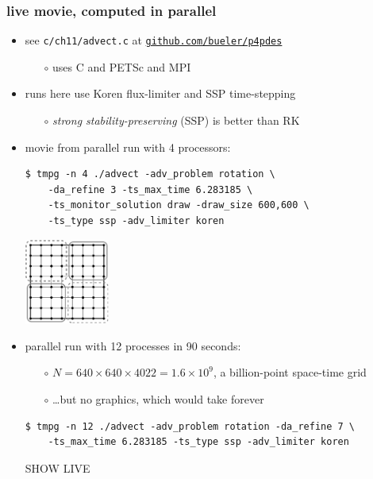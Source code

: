 \documentclass[10pt,dvipsnames,usepdftitle=false,
hyperref={pdftitle = {Finite volume methods},
    pdfauthor = {Ed Bueler}}]{beamer}
\begin{document}
\begin{frame}[fragile]
\frametitle{live movie, computed in parallel}

\begin{itemize}
\item see \texttt{c/ch11/advect.c} at \href{https://github.com/bueler/p4pdes}{\texttt{github.com/bueler/p4pdes}}
    \begin{itemize}
    \item[$\circ$] uses C and PETSc and MPI
    \end{itemize}
\item runs here use Koren flux-limiter and SSP time-stepping
    \begin{itemize}
    \item[$\circ$] \emph{strong stability-preserving} (SSP) is better than RK
    \end{itemize}
\item movie from parallel run with 4 processors:
\begin{Verbatim}[fontsize=\footnotesize]
$ tmpg -n 4 ./advect -adv_problem rotation \
    -da_refine 3 -ts_max_time 6.283185 \
    -ts_monitor_solution draw -draw_size 600,600 \
    -ts_type ssp -adv_limiter koren
\end{Verbatim}

\vspace{-20mm}
\hfill \includegraphics[width=0.22\textwidth]{figs/buelerfourproc}

\vspace{-1mm}
\item parallel run with 12 processes in 90 seconds:
    \begin{itemize}
    \item[$\circ$] $N=640\times 640 \times 4022 = 1.6 \times 10^9$, a billion-point space-time grid
    \item[$\circ$] \dots but no graphics, which would take forever
    \end{itemize}
\begin{Verbatim}[fontsize=\footnotesize]
$ tmpg -n 12 ./advect -adv_problem rotation -da_refine 7 \
    -ts_max_time 6.283185 -ts_type ssp -adv_limiter koren
\end{Verbatim}

\bigskip
\hspace{15mm} \alert{SHOW LIVE}
\end{itemize}
\end{frame}
\end{document}
